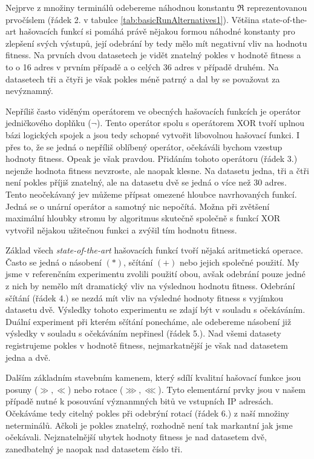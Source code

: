 Nejprve z množiny terminálů odebereme náhodnou konstantu $\Re$ reprezentovanou prvočíslem (řádek 2. v tabulce
\ref{tab:basicRunAlternatives1}).
Většina state-of-the-art
hašovacích funkcí si pomáhá právě nějakou formou náhodné konstanty pro zlepšení svých výstupů, její odebrání by tedy
mělo mít negativní vliv na hodnotu fitness. Na prvních dvou
datasetech je vidět znatelný pokles v hodnotě fitness a to o 16 adres v prvním případě a o celých 36 adres
v případě druhém. Na datasetech tři a čtyři je však pokles méně patrný a dal by se považovat za nevýznamný.

Nepříliš často viděným operátorem ve obecných hašovacích funkcích je operátor jedničkového doplňku ($\neg$).
Tento operátor
spolu s operátorem XOR tvoří uplnou bázi logických spojek a jsou tedy schopné vytvořit libovolnou hašovací funkci.
I přes to, že se jedná o nepříliš oblíbený operátor, očekáváli bychom vzestup hodnoty fitness.
Opeak je však pravdou. Přidáním tohoto operátoru (řádek 3.) nejenže hodnota fitness nevzroste, ale naopak klesne. Na datasetu
jedna, tři a čtři není pokles příjiš znatelný, ale na datasetu dvě se jedná o více než 30 adres. Tento neočekávaný jev
můžeme přípsat omezené hloubce navrhovaných funkcí. Jedná se o unární operátor a samotný nic nepočítá. Možna při 
zvětšení maximální hloubky stromu by algoritmus skutečně společně s funkcí XOR vytvořil nějakou užitečnou funkci a
zvýšil tím hodnotu fitness.

Základ všech \textit{state-of-the-art} hašovacích funkcí tvoří nějaká aritmetická operace. Často
se jedná o násobení $(*)$, sčítání $(+)$ nebo jejich společné použití. My jsme v referenčním experimentu zvolili použití 
obou, avšak odebrání pouze jedné z nich by nemělo mít dramatický vliv na výslednou hodnotu fitness. Odebrání
sčítání (řádek 4.) se nezdá mít vliv na výsledné hodnoty fitness s vyjímkou datasetu dvě. Výsledky tohoto
experimentu se zdají být v souladu s očekáváním. Duální experiment při kterém sčítání ponecháme, ale odebereme
násobení již výsledky v souladu s očekáváním nepřinesl (řádek 5.). Nad všemi datasety registrujeme pokles v hodnotě
fitness, nejmarkatnější je však nad datasetem jedna a dvě.

Dalším základním stavebním kamenem, který sdílí kvalitní hašovací funkce jsou posuny ($\gg , \ll$) nebo rotace
($\ggg , \lll$). Tyto elementární prvky jsou v našem případě nutné k posouvání význanmných bitů ve vstupních IP
adresách. Očekáváme tedy citelný pokles při odebrýní rotací (řádek 6.) z naší množiny neterminálů. Ačkoli je pokles
znatelný, rozhodně není tak markantní jak jsme očekávali. Nejznatelnější ubytek hodnoty fitness je nad datasetem dvě,
zanedbatelný je naopak nad datasetem číslo tři.

